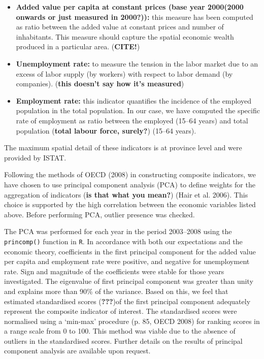 \documentclass[10pt]{article}
\theoremstyle{definition}
\theoremstyle{plain}
\begin{document}
\begin{itemize}
\item \textbf{Added value per capita at constant prices (base year 2000(\textbf{2000 onwards or just measured in 2000?})):} this measure has been computed as ratio between the added value at constant prices and number of inhabitants. This measure should capture the spatial economic wealth produced in a particular area. (\textbf{CITE!})
\item \textbf{Unemployment rate:} to measure the tension in the labor market due to an excess of labor supply (by workers) with respect to labor demand (by companies). (\textbf{this doesn't say how it's measured})
\item \textbf{Employment rate:} this indicator quantifies the incidence of the employed population in the total population. In our case, we have computed the specific rate of employment as ratio between the employed (15--64 years) and total population (\textbf{total labour force, surely?}) (15--64 years). 
\end{itemize}

The maximum spatial detail of these indicators is at province level and were provided by ISTAT.

Following the methods of OECD (2008) in constructing composite indicators, we have chosen to use principal component analysis (PCA) to define weights for the aggregation of indicators (\textbf{is that what you mean?}) (Hair et al. 2006). This choice is supported by the high correlation between the economic variables listed above. Before performing PCA, outlier presence was checked.

The PCA was performed for each year in the period 2003--2008 using the \texttt{princomp()} function in \texttt{R}. In accordance with both our expectations and the economic theory, coefficients in the first principal component for the added value per capita and employment rate were positive, and negative for unemployment rate. Sign and magnitude of the coefficients were stable for those years investigated. The eigenvalue of first principal component was greater than unity and explains more than 90\% of the variance. Based on this, we feel that estimated standardised scores (\textbf{???})of the first principal component adequately represent the composite indicator of interest. The standardised scores were normalised using a `min-max' procedure (p. 85, OECD 2008) for ranking scores in a range scale from 0 to 100. This method was viable due to the absence of outliers in the standardised scores. Further details on the results of principal component analysis are available upon request.
 
\end{document}

